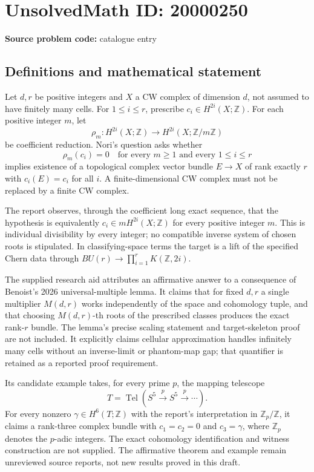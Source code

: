 \documentclass[11pt]{article}
\newcommand{\Z}{\mathbb{Z}}
\begin{document}
\section*{UnsolvedMath ID: 20000250}
\textbf{Source problem code:} catalogue entry
\subsection{Definitions and mathematical statement}
Let $d,r$ be positive integers and $X$ a CW complex of dimension $d$, not assumed to have finitely many cells. For $1\leq i\leq r$, prescribe $c_i\in H^{2i}(X;\Z)$. For each positive integer $m$, let
\[
 \rho_m:H^{2i}(X;\Z)\longrightarrow H^{2i}(X;\Z/m\Z)
\]
be coefficient reduction. Nori's question asks whether
\[
 \rho_m(c_i)=0\quad\text{for every }m\geq1\text{ and every }1\leq i\leq r
\]
implies existence of a topological complex vector bundle $E\to X$ of rank exactly $r$ with $c_i(E)=c_i$ for all $i$. A finite-dimensional CW complex must not be replaced by a finite CW complex.

The report observes, through the coefficient long exact sequence, that the hypothesis is equivalently $c_i\in mH^{2i}(X;\Z)$ for every positive integer $m$. This is individual divisibility by every integer; no compatible inverse system of chosen roots is stipulated. In classifying-space terms the target is a lift of the specified Chern data through $BU(r)\to\prod_{i=1}^rK(\Z,2i)$.

The supplied research aid attributes an affirmative answer to a consequence of Benoist's 2026 universal-multiple lemma. It claims that for fixed $d,r$ a single multiplier $M(d,r)$ works independently of the space and cohomology tuple, and that choosing $M(d,r)$-th roots of the prescribed classes produces the exact rank-$r$ bundle. The lemma's precise scaling statement and target-skeleton proof are not included. It explicitly claims cellular approximation handles infinitely many cells without an inverse-limit or phantom-map gap; that quantifier is retained as a reported proof requirement.

Its candidate example takes, for every prime $p$, the mapping telescope
\[
 T=\operatorname{Tel}(S^5\xrightarrow{p}S^5\xrightarrow{p}\cdots).
\]
For every nonzero $\gamma\in H^6(T;\Z)$ with the report's interpretation in $\Z_p/\Z$, it claims a rank-three complex bundle with $c_1=c_2=0$ and $c_3=\gamma$, where $\Z_p$ denotes the $p$-adic integers. The exact cohomology identification and witness construction are not supplied. The affirmative theorem and example remain unreviewed source reports, not new results proved in this draft.
\end{document}
